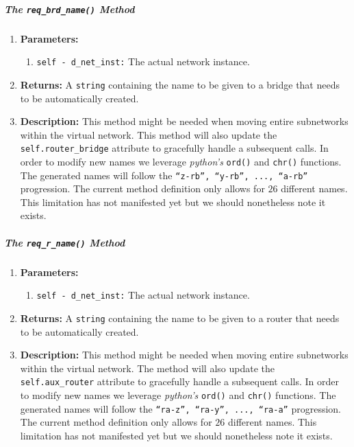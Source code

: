         \subparagraph{The \texttt{req\_brd\_name()} Method}
            \begin{enumerate}
                \item \textbf{Parameters:}
                \begin{enumerate}
                    \item \texttt{self - d\_net\_inst:} The actual network instance.
                \end{enumerate}
                \item \textbf{Returns:} A \texttt{string} containing the name to be given to a bridge that needs to be automatically created.
                \item \textbf{Description:} This method might be needed when moving entire subnetworks within the virtual network. This method will also update the \texttt{self.router\_bridge} attribute to gracefully handle a subsequent calls. In order to modify new names we leverage \textit{python's} \texttt{ord()} and \texttt{chr()} functions. The generated names will follow the \texttt{``z-rb'', ``y-rb'', ..., ``a-rb''} progression. The current method definition only allows for $26$ different names. This limitation has not manifested yet but we should nonetheless note it exists.
            \end{enumerate}

        \subparagraph{The \texttt{req\_r\_name()} Method}
            \begin{enumerate}
                \item \textbf{Parameters:}
                \begin{enumerate}
                    \item \texttt{self - d\_net\_inst:} The actual network instance.
                \end{enumerate}
                \item \textbf{Returns:} A \texttt{string} containing the name to be given to a router that needs to be automatically created.
                \item \textbf{Description:} This method might be needed when moving entire subnetworks within the virtual network. The method will also update the \texttt{self.aux\_router} attribute to gracefully handle a subsequent calls. In order to modify new names we leverage \textit{python's} \texttt{ord()} and \texttt{chr()} functions. The generated names will follow the \texttt{``ra-z'', ``ra-y'', ..., ``ra-a''} progression. The current method definition only allows for $26$ different names. This limitation has not manifested yet but we should nonetheless note it exists.
            \end{enumerate}

